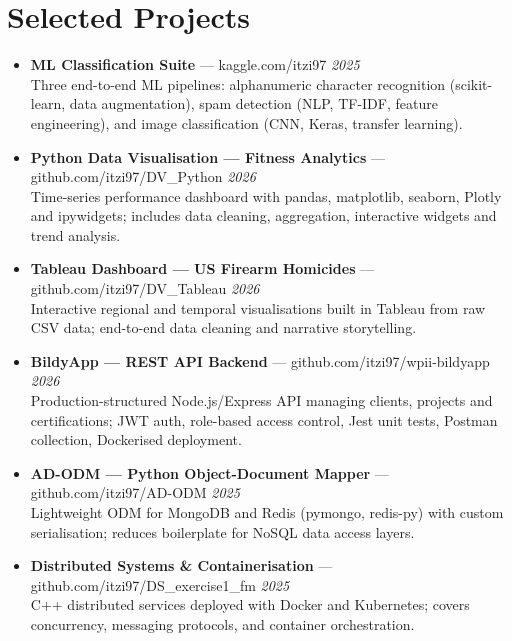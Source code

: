\documentclass[10pt,a4paper]{article}
\begin{document}
\section{Selected Projects}
{\small
\begin{itemize}

  \item \textbf{ML Classification Suite} --- kaggle.com/itzi97 \hfill \textit{2025}\\
  Three end-to-end ML pipelines: alphanumeric character recognition (scikit-learn, data augmentation),
  spam detection (NLP, TF-IDF, feature engineering), and image classification (CNN, Keras, transfer learning).

  \item \textbf{Python Data Visualisation --- Fitness Analytics} --- github.com/itzi97/DV\_Python \hfill \textit{2026}\\
  Time-series performance dashboard with pandas, matplotlib, seaborn, Plotly and ipywidgets;
  includes data cleaning, aggregation, interactive widgets and trend analysis.

  \item \textbf{Tableau Dashboard --- US Firearm Homicides} --- github.com/itzi97/DV\_Tableau \hfill \textit{2026}\\
  Interactive regional and temporal visualisations built in Tableau from raw CSV data;
  end-to-end data cleaning and narrative storytelling.

  \item \textbf{BildyApp --- REST API Backend} --- github.com/itzi97/wpii-bildyapp \hfill \textit{2026}\\
  Production-structured Node.js/Express API managing clients, projects and certifications;
  JWT auth, role-based access control, Jest unit tests, Postman collection, Dockerised deployment.

  \item \textbf{AD-ODM --- Python Object-Document Mapper} --- github.com/itzi97/AD-ODM \hfill \textit{2025}\\
  Lightweight ODM for MongoDB and Redis (pymongo, redis-py) with custom serialisation;
  reduces boilerplate for NoSQL data access layers.

  \item \textbf{Distributed Systems \& Containerisation} --- github.com/itzi97/DS\_exercise1\_fm \hfill \textit{2025}\\
  C++ distributed services deployed with Docker and Kubernetes;
  covers concurrency, messaging protocols, and container orchestration.

\end{itemize}
}
\end{document}
